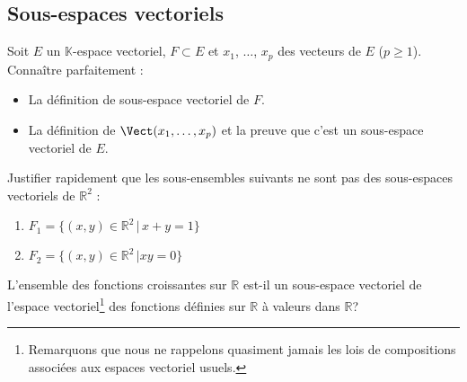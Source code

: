 \documentclass[a4paper,twoside,french,11pt]{VcCours}
\begin{document}
\subsection{Sous-espaces vectoriels}

\begin{ptc}{}
	Soit $E$ un $\mathbb{K}$-espace vectoriel, $F \subset E$ et $x_1$, $\ldots$, $x_p$ des vecteurs de $E$ ($p \geq 1$). Connaître parfaitement :
\begin{itemize}
\item La définition de sous-espace vectoriel de $F$.
\item La définition de $\Vect(x_1, \ldots, x_p)$ et la preuve que c'est un sous-espace vectoriel de $E$.
\end{itemize}
\end{ptc}

%
%
%
%
%
%
%
%

\begin{Exercice}{}
  Justifier rapidement que les sous-ensembles suivants ne sont pas des sous-espaces vectoriels de $\mathbb{R}^2$ :
  
  \begin{enumerate}
    \item $F_1 = \lbrace (x,y) \in \mathbb{R}^2 \, \vert \, x+y=1 \rbrace $
    \item $F_2 = \lbrace (x,y) \in \mathbb{R}^2 \, \vert xy=0 \rbrace $
  \end{enumerate}
\end{Exercice} 

\begin{Exercice}{}
  L'ensemble des fonctions croissantes sur $\mathbb{R}$ est-il un sous-espace vectoriel de l'espace vectoriel\footnote{Remarquons que nous ne rappelons quasiment jamais les lois de compositions associées aux espaces vectoriel usuels.} des fonctions définies sur $\mathbb{R}$ à valeurs dans $\mathbb{R}$?
\end{Exercice} 
\end{document}
